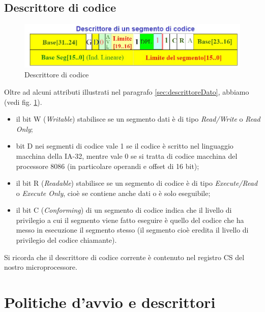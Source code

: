 \subsection{Descrittore di codice}
\label{sec:descrittoreCodice}

\begin{figure}[!h]
\centering
\includegraphics[width=0.75\columnwidth]{img/segCodice}
\caption{Descrittore di codice}
\label{fig:segCodice}
\end{figure}
Oltre ad alcuni attributi illustrati nel paragrafo \ref{sec:descrittoreDato}, abbiamo (vedi fig. \ref{fig:segCodice}).
\begin{itemize}
\item il bit W (\textit{Writable}) stabilisce se un segmento dati è di tipo \textit{Read/Write} o \textit{Read Only};
\item bit D nei segmenti di codice vale 1 se il codice è scritto nel linguaggio macchina della IA-32, mentre vale 0 se si tratta di codice macchina del processore 8086 (in particolare operandi e offset di 16 bit);
\item il bit R (\textit{Readable}) stabilisce se un segmento di codice è di tipo \textit{Execute/Read} o \textit{Execute Only}, cioè se contiene anche dati o è solo eseguibile;
\item il bit C (\textit{Conforming}) di un segmento di codice indica che il livello di privilegio a cui il segmento viene fatto eseguire è quello del codice che ha messo in esecuzione il segmento stesso (il segmento cioè eredita il livello di privilegio del codice chiamante).
\end{itemize}

Si ricorda che il descrittore di codice corrente è contenuto nel registro CS del nostro microprocessore.

\section{Politiche d'avvio e descrittori}
\label{sec:avvioDescrittori}

